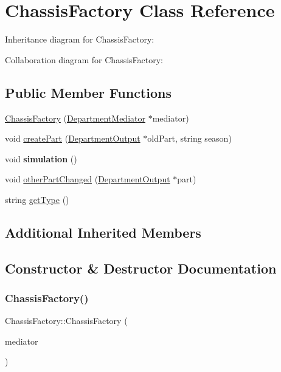 \hypertarget{classChassisFactory}{}\section{Chassis\+Factory Class Reference}
\label{classChassisFactory}


Inheritance diagram for Chassis\+Factory\+:


Collaboration diagram for Chassis\+Factory\+:
\subsection*{Public Member Functions}
\begin{DoxyCompactItemize}
\item 
\hyperlink{classChassisFactory_a14dc5cd1b2491cc6fb61084eeec2a169}{Chassis\+Factory} (\hyperlink{classDepartmentMediator}{Department\+Mediator} $\ast$mediator)
\item 
void \hyperlink{classChassisFactory_aeeb7d210e8c3ca1a3e3b2998705b0d90}{create\+Part} (\hyperlink{classDepartmentOutput}{Department\+Output} $\ast$old\+Part, string season)
\item 
\mbox{\label{classChassisFactory_a80d7b3f0cb610967088f6ed89a71b2bb}} 
void {\bfseries simulation} ()
\item 
void \hyperlink{classChassisFactory_a15eb17dfcb995b9dcc75d4908e49a17f}{other\+Part\+Changed} (\hyperlink{classDepartmentOutput}{Department\+Output} $\ast$part)
\item 
string \hyperlink{classChassisFactory_af038789501da489aeccb19520dc09686}{get\+Type} ()
\end{DoxyCompactItemize}
\subsection*{Additional Inherited Members}


\subsection{Constructor \& Destructor Documentation}
\mbox{\label{classChassisFactory_a14dc5cd1b2491cc6fb61084eeec2a169}} 
\subsubsection{\texorpdfstring{Chassis\+Factory()}{ChassisFactory()}}
{\footnotesize\ttfamily Chassis\+Factory\+::\+Chassis\+Factory (\begin{DoxyParamCaption}\item[{\hyperlink{classDepartmentMediator}{Department\+Mediator} $\ast$}]{mediator }\end{DoxyParamCaption})}


